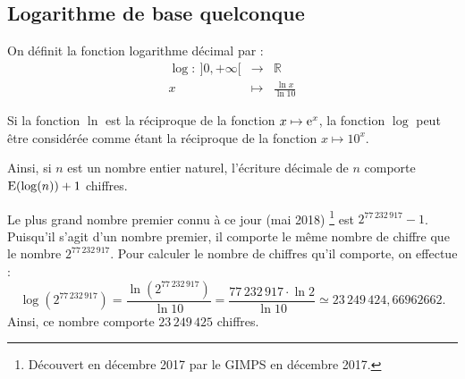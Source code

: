       \subsection{Logarithme de base quelconque}
            \begin{defi}
                  On d\'efinit la fonction logarithme d\'ecimal par :
                        \begin{equation*}
                              \begin{array}{rcl}
                                    \log :\ ]0,+\infty[ & \rightarrow & \mathbb{R}      \\
                                                     x & \mapsto     & \frac{\ln x}{\ln 10}
                              \end{array}
                        \end{equation*}
            \end{defi}
            \begin{prop}
                  Si la fonction $\ln$ est la r\'eciproque de la fonction $x\mapsto \mathrm{e}^{x}$,
                  la fonction $\log$ peut \^etre consid\'er\'ee comme \'etant la r\'eciproque de la fonction $x\mapsto 10^x$.
                  
                  Ainsi, si $n$ est un nombre entier naturel, l'\'ecriture d\'ecimale de $n$ comporte 
                  $\mathrm{E}\!\left(\log (n)\right)+1$ chiffres.
                        \begin{ex}
                              Le plus grand nombre premier connu \`a ce jour (mai 2018)%
                                    \footnote{%
                                    D\'ecouvert en d\'ecembre 2017 par le GIMPS en d\'ecembre 2017.
                                                }
                              est $2^{77\, 232\, 917} - 1$.
                              Puisqu'il s'agit d'un nombre premier, 
                              il comporte le m\^eme nombre de chiffre que le nombre $2^{77\, 232\, 917}$.
                              Pour calculer le nombre de chiffres qu'il comporte, on effectue :
                                    \[
                                           \log (2^{77\, 232\, 917})
                                    =      \frac{\ln (2^{77\, 232\, 917})}{\ln 10} 
                                    =      \frac{77\, 232\, 917 \cdot \ln 2}{\ln 10}
                                    \simeq 23\,249\,424,66962662
                                    .
                                    \]
                              Ainsi, ce nombre comporte $23\,249\,425$ chiffres.
                        \end{ex}
            \end{prop}
